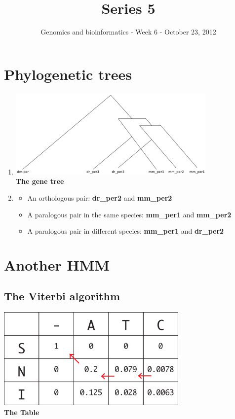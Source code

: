 \documentclass[a4paper,11pt]{article}
\title{Series 5}
\date{}
\author{Genomics and bioinformatics - Week 6 - October 23, 2012}
\begin{document}
\maketitle

\section{Phylogenetic trees}

\begin{enumerate}
\item 
\begin{center}
\includegraphics[width=0.8\textwidth]{tree.png}\\
\vspace{0.5cm}
{\bf The gene tree}
\end{center}

\item
\begin{itemize} 
\item An orthologous pair: {\bf dr\_per2} and {\bf mm\_per2}

\item A paralogous pair in the same species: {\bf mm\_per1} and {\bf mm\_per2}

\item A paralogous pair in different species: {\bf mm\_per1} and {\bf dr\_per2}
\end{itemize}
\end{enumerate}

\section{Another HMM}

\subsection{The Viterbi algorithm}

\begin{center}
\includegraphics[width=0.7\textwidth]{fig3.eps}\\
\vspace{0.5cm}
{\bf The Table}
\end{center}


\end{document}
